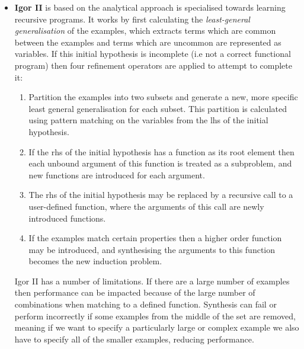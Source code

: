 \begin{itemize}
\item \textbf{Igor II} is based on the analytical approach is specialised towards learning recursive programs. It works by first calculating the \textit{least-general generalisation} of the examples, which extracts terms which are common between the examples and terms which are uncommon are represented as variables. If this initial hypothesis is incomplete (i.e not a correct functional program) then four refinement operators are applied to attempt to complete it:
\begin{enumerate}
\item Partition the examples into two subsets and generate a new, more specific least general generalisation for each subset. This partition is calculated using pattern matching on the variables from the lhs of the initial hypothesis.
\item If the rhs of the initial hypothesis has a function as its root element then each unbound argument of this function is treated as a subproblem, and new functions are introduced for each argument.
\item The rhs of the initial hypothesis may be replaced by a recursive call to a user-defined function, where the arguments of this call are newly introduced functions.
\item If the examples match certain properties then a higher order function may be introduced, and synthesising the arguments to this function becomes the new induction problem.
\end{enumerate}
Igor II has a number of limitations. If there are a large number of examples then performance can be impacted because of the large number of combinations when matching to a defined function. Synthesis can fail or perform incorrectly if some examples from the middle of the set are removed, meaning if we want to specify a particularly large or complex example we also have to specify all of the smaller examples, reducing performance.
\end{itemize}

\pagebreak
\renewcommand\bibname{{References}}

